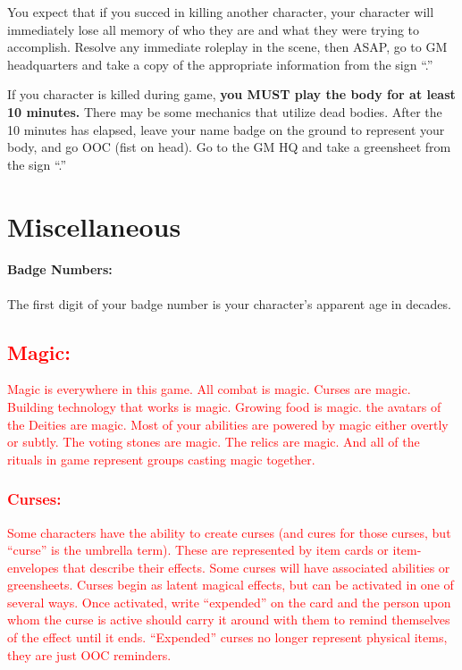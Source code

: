 \documentclass[sheet]{GL2020}
\begin{document}
You expect that if you succed in killing another character, your character will immediately lose all memory of who they are and what they were trying to accomplish. Resolve any immediate roleplay in the scene, then ASAP, go to GM headquarters and take a copy of the appropriate information from the sign ``\sMurderConsequences{}.''

If you character is killed during game, \textbf{you MUST play the body for at least 10 minutes.} There may be some mechanics that utilize dead bodies. After the 10 minutes has elapsed, leave your name badge on the ground to represent your body, and go OOC (fist on head). Go to the GM HQ and take a greensheet from the sign ``\sMurdered{}.''

\section{Miscellaneous}

\paragraph{Badge Numbers:} The first digit of your badge number is your character's apparent age in decades.

\textcolor{red}{\subsection{Magic:}}
\textcolor{red}{Magic is everywhere in this game. All combat is magic. Curses are magic. Building technology that works is magic. Growing food is magic. the avatars of the Deities are magic. Most of your abilities are powered by magic either overtly or subtly. The voting stones are magic. The relics are magic. And all of the rituals in game represent groups casting magic together.}

\textcolor{red}{\subsubsection{Curses:}}
\textcolor{red}{Some characters have the ability to create curses (and cures for those curses, but ``curse'' is the umbrella term). These are represented by item cards or item-envelopes that describe their effects. Some curses will have associated abilities or greensheets. Curses begin as latent magical effects, but can be activated in one of several ways. Once activated, write ``expended'' on the card and the person upon whom the curse is active should carry it around with them to remind themselves of the effect until it ends. ``Expended'' curses no longer represent physical items, they are just OOC reminders.}
\end{document}
